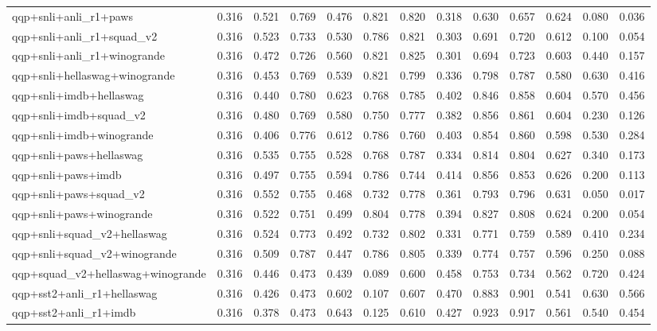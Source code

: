 \begin{table}[t]
\begin{tabular}{lrrrrrrrrrrrr}
    qqp+snli+anli\_r1+paws & 0.316 & 0.521 & 0.769 & 0.476 & 0.821 & 0.820 & 0.318 & 0.630 & 0.657 & 0.624 & 0.080 & 0.036 \\
    qqp+snli+anli\_r1+squad\_v2 & 0.316 & 0.523 & 0.733 & 0.530 & 0.786 & 0.821 & 0.303 & 0.691 & 0.720 & 0.612 & 0.100 & 0.054 \\
    qqp+snli+anli\_r1+winogrande & 0.316 & 0.472 & 0.726 & 0.560 & 0.821 & 0.825 & 0.301 & 0.694 & 0.723 & 0.603 & 0.440 & 0.157 \\
    qqp+snli+hellaswag+winogrande & 0.316 & 0.453 & 0.769 & 0.539 & 0.821 & 0.799 & 0.336 & 0.798 & 0.787 & 0.580 & 0.630 & 0.416 \\
    qqp+snli+imdb+hellaswag & 0.316 & 0.440 & 0.780 & 0.623 & 0.768 & 0.785 & 0.402 & 0.846 & 0.858 & 0.604 & 0.570 & 0.456 \\
    qqp+snli+imdb+squad\_v2 & 0.316 & 0.480 & 0.769 & 0.580 & 0.750 & 0.777 & 0.382 & 0.856 & 0.861 & 0.604 & 0.230 & 0.126 \\
    qqp+snli+imdb+winogrande & 0.316 & 0.406 & 0.776 & 0.612 & 0.786 & 0.760 & 0.403 & 0.854 & 0.860 & 0.598 & 0.530 & 0.284 \\
    qqp+snli+paws+hellaswag & 0.316 & 0.535 & 0.755 & 0.528 & 0.768 & 0.787 & 0.334 & 0.814 & 0.804 & 0.627 & 0.340 & 0.173 \\
    qqp+snli+paws+imdb & 0.316 & 0.497 & 0.755 & 0.594 & 0.786 & 0.744 & 0.414 & 0.856 & 0.853 & 0.626 & 0.200 & 0.113 \\
    qqp+snli+paws+squad\_v2 & 0.316 & 0.552 & 0.755 & 0.468 & 0.732 & 0.778 & 0.361 & 0.793 & 0.796 & 0.631 & 0.050 & 0.017 \\
    qqp+snli+paws+winogrande & 0.316 & 0.522 & 0.751 & 0.499 & 0.804 & 0.778 & 0.394 & 0.827 & 0.808 & 0.624 & 0.200 & 0.054 \\
    qqp+snli+squad\_v2+hellaswag & 0.316 & 0.524 & 0.773 & 0.492 & 0.732 & 0.802 & 0.331 & 0.771 & 0.759 & 0.589 & 0.410 & 0.234 \\
    qqp+snli+squad\_v2+winogrande & 0.316 & 0.509 & 0.787 & 0.447 & 0.786 & 0.805 & 0.339 & 0.774 & 0.757 & 0.596 & 0.250 & 0.088 \\
    qqp+squad\_v2+hellaswag+winogrande & 0.316 & 0.446 & 0.473 & 0.439 & 0.089 & 0.600 & 0.458 & 0.753 & 0.734 & 0.562 & 0.720 & 0.424 \\
    qqp+sst2+anli\_r1+hellaswag & 0.316 & 0.426 & 0.473 & 0.602 & 0.107 & 0.607 & 0.470 & 0.883 & 0.901 & 0.541 & 0.630 & 0.566 \\
    qqp+sst2+anli\_r1+imdb & 0.316 & 0.378 & 0.473 & 0.643 & 0.125 & 0.610 & 0.427 & 0.923 & 0.917 & 0.561 & 0.540 & 0.454 \\

\end{tabular}
\end{table}
